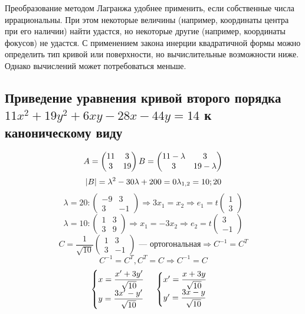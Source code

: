 \documentclass[12pt]{article}
\begin{document}
Преобразование методом Лагранжа удобнее применить, если собственные числа иррациональны. При этом некоторые величины (например, координаты центра при его наличии) найти удастся, но некоторые другие (например, координаты фокусов) не удастся. С применением закона инерции квадратичной формы можно определить тип кривой или поверхности, но вычислительные возможности ниже. Однако вычислений может потребоваться меньше.

\subsection{Приведение уравнения кривой второго порядка $11x^2 + 19y^2 + 6xy - 28x - 44y = 14$ к каноническому виду}
\[
    A = \begin{pmatrix}
        11 & 3  \\
        3  & 19
    \end{pmatrix}
    \\
    B = \begin{pmatrix}
        11 - \lambda & 3            \\
        3            & 19 - \lambda
    \end{pmatrix}
\]
\[
    |B| = \lambda^2 - 30\lambda + 200 = 0
    \\ \lambda_{1, 2} = 10; 20
\]
\[
    \lambda = 20:
    \begin{pmatrix}
        -9 & 3  \\
        3  & -1
    \end{pmatrix}
    \Rightarrow
    3x_1 = x_2
    \Rightarrow
    e_1 = t\begin{pmatrix}1 \\ 3\end{pmatrix}
\]
\[
    \lambda = 10:
    \begin{pmatrix}
        1 & 3 \\
        3 & 9
    \end{pmatrix}
    \Rightarrow
    x_1 = -3x_2
    \Rightarrow
    e_2  = t\begin{pmatrix}3 \\ -1\end{pmatrix}
\]
\[
    C = \dfrac{1}{\sqrt{10}}\begin{pmatrix}
        1 & 3  \\
        3 & -1
    \end{pmatrix} \text{ — ортогональная}
    \Rightarrow
    C^{-1} = C^T
\]
\[
    C^{-1} = C^T, C^T = C \Rightarrow C^{-1} = C
\]
\[
    \begin{cases}
        x = \dfrac{x' + 3y'}{\sqrt{10}} \\
        y = \dfrac{3x' - y'}{\sqrt{10}}
    \end{cases} \\
    \begin{cases}
        x' = \dfrac{x + 3y}{\sqrt{10}} \\
        y' = \dfrac{3x - y}{\sqrt{10}}
    \end{cases}
\]
\end{document}
